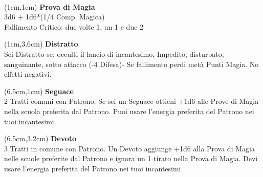 \documentclass[a4paper,12 pt,openany]{book}
\begin{document}
	~\newpage

\begin{textblock*}{5cm}(1cm,1cm) %
		\textbf{Prova di Magia}\\
3d6 + 1d6*(1/4 Comp. Magica)\\
Fallimento Critico: due volte 1, un 1 e due 2\\
	\end{textblock*}

\begin{textblock*}{5cm}(1cm,3.6cm) %
	\textbf{Distratto}\\
Sei Distratto se: occulti il lancio di incantesimo, Impedito, disturbato, sanguinante, sotto attacco (-4 Difesa)-
Se fallimento perdi metà Punti Magia. No effetti negativi.\\
\end{textblock*}

\begin{textblock*}{13.5cm}(6.5cm,1cm) %
	\textbf{Seguace}\\
2 Tratti comuni con Patrono. Se sei un Seguace ottieni +1d6 alle Prove di Magia nella scuola preferita dal Patrono. Puoi usare l'energia preferita del Patrono nei tuoi incantesimi.\\
\end{textblock*}

\begin{textblock*}{13.5cm}(6.5cm,3.2cm) %
	\textbf{Devoto}\\
3 Tratti in comune con Patrono. Un Devoto aggiunge +1d6 alla Prova di Magia nelle scuole preferite dal Patrono e ignora un 1 tirato nella Prova di Magia. Devi usare l'energia preferita del Patrono nei tuoi incantesimi.
\end{textblock*}
\end{document}
